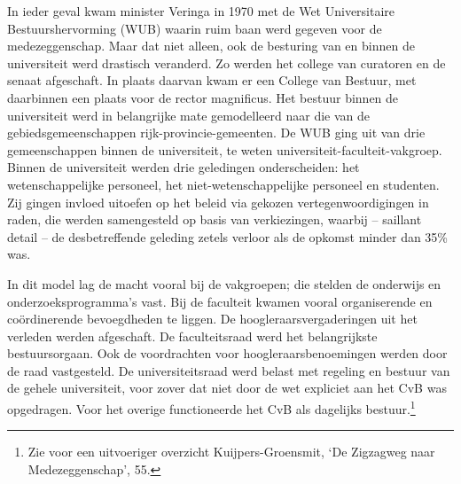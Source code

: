 \documentclass[smallauthor, chapterhaspagenum, nochapterinheader, pagenuminheader,  bigchapnum,medium2, tocpages,  garamond, titleinheader]{jote-book}
\begin{document}
	In ieder geval kwam minister Veringa in 1970 met de Wet Universitaire Bestuurshervorming (WUB) waarin ruim baan werd gegeven voor de medezeggenschap. Maar dat niet alleen, ook de besturing van en binnen de universiteit werd drastisch veranderd. Zo werden het college van curatoren en de senaat afgeschaft. In plaats daarvan kwam er een College van Bestuur, met daarbinnen een plaats voor de rector magnificus. Het bestuur binnen de universiteit werd in belangrijke mate gemodelleerd naar die van de gebiedsgemeenschappen rijk-provincie-gemeenten. De WUB ging uit van drie gemeenschappen binnen de universiteit, te weten universiteit-faculteit-vakgroep. Binnen de universiteit werden drie geledingen onderscheiden: het wetenschappelijke personeel, het niet-wetenschappelijke personeel en studenten. Zij gingen invloed uitoefen op het beleid via gekozen vertegenwoordigingen in raden, die werden samengesteld op basis van verkiezingen, waarbij -- saillant detail -- de desbetreffende geleding zetels verloor als de opkomst minder dan 35\% was.



	In dit model lag de macht vooral bij de vakgroepen; die stelden de onderwijs en onderzoeksprogramma's vast. Bij de faculteit kwamen vooral organiserende en coördinerende bevoegdheden te liggen. De hoogleraarsvergaderingen uit het verleden werden afgeschaft. De faculteitsraad werd het belangrijkste bestuursorgaan. Ook de voordrachten voor hoogleraarsbenoemingen werden door de raad vastgesteld. De universiteitsraad werd belast met regeling en bestuur van de gehele universiteit, voor zover dat niet door de wet expliciet aan het CvB was opgedragen. Voor het overige functioneerde het CvB als dagelijks bestuur.\footnote{Zie voor een uitvoeriger overzicht Kuijpers-Groensmit, ‘De Zigzagweg naar Medezeggenschap', 55.}
\end{document}
